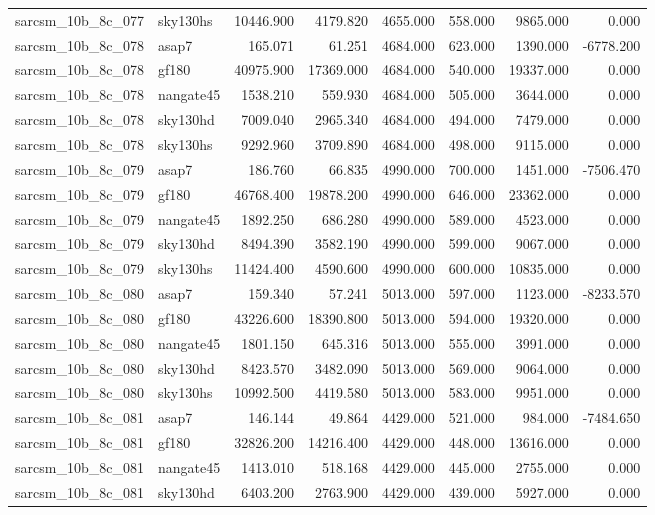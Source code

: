 \begin{tabular}{llrrrrrr}
sarcsm\_10b\_8c\_077 & sky130hs & 10446.900 & 4179.820 & 4655.000 & 558.000 & 9865.000 & 0.000 \\
sarcsm\_10b\_8c\_078 & asap7 & 165.071 & 61.251 & 4684.000 & 623.000 & 1390.000 & -6778.200 \\
sarcsm\_10b\_8c\_078 & gf180 & 40975.900 & 17369.000 & 4684.000 & 540.000 & 19337.000 & 0.000 \\
sarcsm\_10b\_8c\_078 & nangate45 & 1538.210 & 559.930 & 4684.000 & 505.000 & 3644.000 & 0.000 \\
sarcsm\_10b\_8c\_078 & sky130hd & 7009.040 & 2965.340 & 4684.000 & 494.000 & 7479.000 & 0.000 \\
sarcsm\_10b\_8c\_078 & sky130hs & 9292.960 & 3709.890 & 4684.000 & 498.000 & 9115.000 & 0.000 \\
sarcsm\_10b\_8c\_079 & asap7 & 186.760 & 66.835 & 4990.000 & 700.000 & 1451.000 & -7506.470 \\
sarcsm\_10b\_8c\_079 & gf180 & 46768.400 & 19878.200 & 4990.000 & 646.000 & 23362.000 & 0.000 \\
sarcsm\_10b\_8c\_079 & nangate45 & 1892.250 & 686.280 & 4990.000 & 589.000 & 4523.000 & 0.000 \\
sarcsm\_10b\_8c\_079 & sky130hd & 8494.390 & 3582.190 & 4990.000 & 599.000 & 9067.000 & 0.000 \\
sarcsm\_10b\_8c\_079 & sky130hs & 11424.400 & 4590.600 & 4990.000 & 600.000 & 10835.000 & 0.000 \\
sarcsm\_10b\_8c\_080 & asap7 & 159.340 & 57.241 & 5013.000 & 597.000 & 1123.000 & -8233.570 \\
sarcsm\_10b\_8c\_080 & gf180 & 43226.600 & 18390.800 & 5013.000 & 594.000 & 19320.000 & 0.000 \\
sarcsm\_10b\_8c\_080 & nangate45 & 1801.150 & 645.316 & 5013.000 & 555.000 & 3991.000 & 0.000 \\
sarcsm\_10b\_8c\_080 & sky130hd & 8423.570 & 3482.090 & 5013.000 & 569.000 & 9064.000 & 0.000 \\
sarcsm\_10b\_8c\_080 & sky130hs & 10992.500 & 4419.580 & 5013.000 & 583.000 & 9951.000 & 0.000 \\
sarcsm\_10b\_8c\_081 & asap7 & 146.144 & 49.864 & 4429.000 & 521.000 & 984.000 & -7484.650 \\
sarcsm\_10b\_8c\_081 & gf180 & 32826.200 & 14216.400 & 4429.000 & 448.000 & 13616.000 & 0.000 \\
sarcsm\_10b\_8c\_081 & nangate45 & 1413.010 & 518.168 & 4429.000 & 445.000 & 2755.000 & 0.000 \\
sarcsm\_10b\_8c\_081 & sky130hd & 6403.200 & 2763.900 & 4429.000 & 439.000 & 5927.000 & 0.000 \\

\end{tabular}
